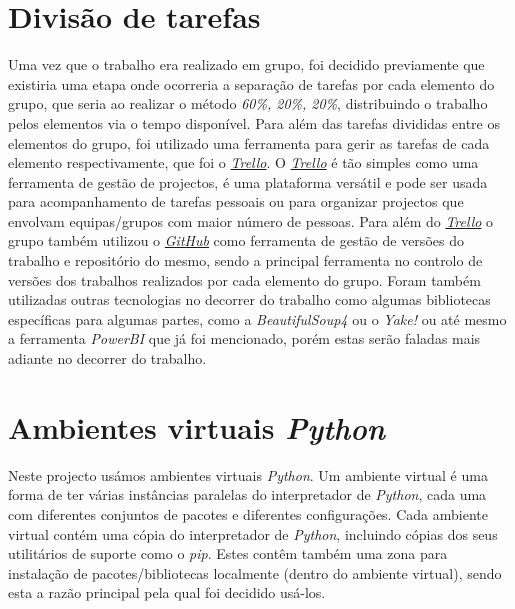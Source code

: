 \section{Divisão de tarefas}
Uma vez que o trabalho era realizado em grupo, foi decidido previamente que existiria uma etapa onde ocorreria a separação de tarefas por cada elemento do grupo, que seria ao realizar o método \textit{60\%, 20\%, 20\%}, distribuindo o trabalho pelos elementos via o tempo disponível. Para além das tarefas divididas entre os elementos do grupo, foi utilizado uma ferramenta para gerir as tarefas de cada elemento respectivamente, que foi o \href{https://trello.com/b/PIApdmTA/pi-2021-22}{\textit{Trello}}. O \href{https://trello.com/b/PIApdmTA/pi-2021-22}{\textit{Trello}} é tão simples como uma ferramenta de gestão de projectos, é uma plataforma versátil e pode ser usada para acompanhamento de tarefas pessoais ou para organizar projectos que envolvam equipas/grupos com maior número de pessoas. Para além do \href{https://trello.com/b/PIApdmTA/pi-2021-22}{\textit{Trello}} o grupo também utilizou o \href{https://github.com/CatKinKitKat/pi2021}{\textit{GitHub}} como ferramenta de gestão de versões do trabalho e repositório do mesmo, sendo a principal ferramenta no controlo de versões dos trabalhos realizados por cada elemento do grupo. Foram também utilizadas outras tecnologias no decorrer do trabalho como algumas bibliotecas específicas para algumas partes, como a \textit{BeautifulSoup4} ou o \textit{Yake!} ou até mesmo a ferramenta \textit{PowerBI} que já foi mencionado, porém estas serão faladas mais adiante no decorrer do trabalho.

\section{Ambientes virtuais \textit{Python}}

Neste projecto usámos ambientes virtuais \textit{Python}. Um ambiente virtual é uma forma de ter várias instâncias paralelas do interpretador de \textit{Python}, cada uma com diferentes conjuntos de pacotes e diferentes configurações.
Cada ambiente virtual contém uma cópia do interpretador de \textit{Python}, incluindo cópias dos seus utilitários de suporte como o \textit{pip}. Estes contêm também uma zona para instalação de pacotes/bibliotecas localmente (dentro do ambiente virtual), sendo esta a razão principal pela qual foi decidido usá-los.